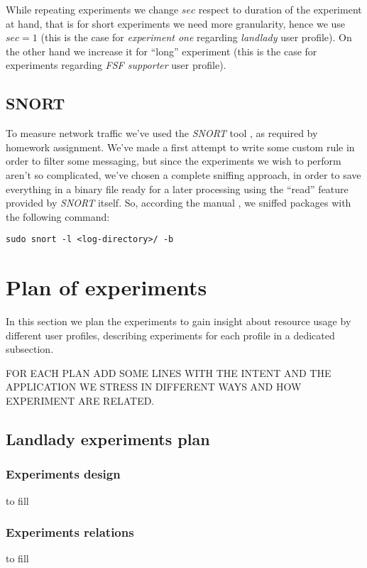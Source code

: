 \documentclass[10pt,a4paper]{article}
\begin{document}
    While repeating experiments we change $sec$ respect to duration of
    the experiment at hand, that is for short experiments we need more
    granularity, hence we use $sec = 1$ (this is the case for
    \emph{experiment one} regarding \emph{landlady} user profile). On
    the other hand we increase it for ``long'' experiment (this is the
    case for experiments regarding \emph{FSF supporter} user profile).

    \subsection{SNORT} 
    To measure network traffic we've used the \emph{SNORT} tool
    \cite{SNORT}, as required by homework assignment. We've made a
    first attempt to write some custom rule in order to filter some
    messaging, but since the experiments we wish to perform aren't so
    complicated, we've chosen a complete sniffing approach, in order
    to save everything in a binary file ready for a later processing
    using the ``read'' feature provided by \emph{SNORT} itself. So,
    according the manual \cite{SNORT-manual}, we sniffed packages with
    the following command:
\begin{verbatim}
sudo snort -l <log-directory>/ -b
\end{verbatim}


    \newpage
    \section{Plan of experiments}
    \label{sec:plan-of-experiment}
    In this section we plan the experiments to gain insight about
    resource usage by different user profiles, describing experiments
    for each profile in a dedicated subsection.

    
    FOR EACH PLAN ADD SOME LINES WITH THE INTENT AND THE APPLICATION
    WE STRESS IN DIFFERENT WAYS AND HOW EXPERIMENT ARE RELATED.

    \subsection{Landlady experiments plan}

    \subsubsection*{Experiments design }
    to fill

    \subsubsection*{Experiments relations}
    to fill
\end{document}
